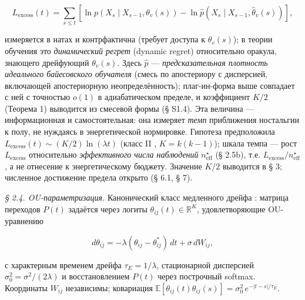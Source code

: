 \documentclass[12pt]{iopart}
\begin{document}
\[L_{\text{excess}}(t) = \sum_{s\le t}\left[\ln p(X_s\mid X_{s-1},\theta_v(s)) - \ln\hat p(X_s\mid X_{s-1}, \hat\theta_v(s))\right],\]



измеряется в натах и контрфактична (требует доступа к \(\theta_v(s)\)); в теории обучения это \emph{динамический регрет} (dynamic regret) относительно оракула, знающего дрейфующий \(\theta_v(s)\). Здесь \(\hat p\) --- \emph{предсказательная плотность идеального байесовского обучателя} (смесь по апостериору с дисперсией, включающей апостериорную неопределённость); плаг-ин-форма выше совпадает с ней с точностью \(o(1)\) в адиабатическом пределе, и коэффициент \(K/2\) (Теорема 1) выводится из смесевой формы (§ S1.4). Эта величина --- информационная и самостоятельная: она измеряет \emph{темп} приближения ностальгии к полу, не нуждаясь в энергетической нормировке. Гипотеза \cite{Andriishin2026b} предположила \(L_{\text{excess}}(t) \sim (K/2)\ln(\lambda t)\) (класс II \cite{BialekNemenmanTishby2001}, \(K = k(k-1)\)); шкала темпа --- рост \(L_{\text{excess}}\) относительно \emph{эффективного числа наблюдений} \(n_{\text{eff}}^\star\) (§ 2.5b), т.е. \(L_{\text{excess}}/n_{\text{eff}}^\star\), а не отнесение к энергетическому бюджету. Значение \(K/2\) выводится в § 3; численное достижение предела открыто (§ 6.1, § 7).



\emph{§ 2.4. OU-параметризация.} Канонический класс медленного дрейфа \cite{Andriishin2026b}: матрица переходов \(P(t)\) задаётся через логиты \(\theta_{ij}(t) \in \mathbb{R}^K\), удовлетворяющие OU-уравнению



\begin{equation}d\theta_{ij} = -\lambda(\theta_{ij} - \theta_{ij}^*)\,dt + \sigma\,dW_{ij}, \tag{2.1}\end{equation}



с характерным временем дрейфа \(\tau_E = 1/\lambda\), стационарной дисперсией \(\sigma_0^2 = \sigma^2/(2\lambda)\) и восстановлением \(P(t)\) через построчный softmax. Координаты \(W_{ij}\) независимы; ковариация \(\mathbb{E}[\theta_{ij}(t)\theta_{ij}(s)] = \sigma_0^2\,e^{-|t-s|/\tau_E}\).
\end{document}
